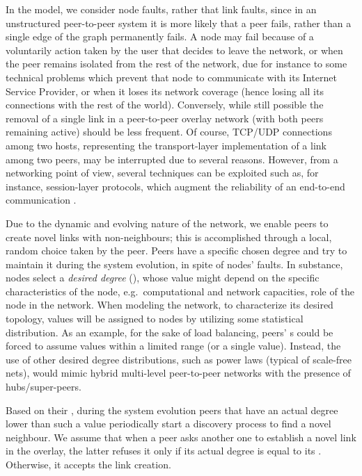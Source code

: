 \documentclass[a4paper,twosided]{article}
\begin{document}
In the model, we consider node faults, rather that link faults,
since in an unstructured peer-to-peer system it is more likely that a peer fails, rather than a single edge of the graph permanently fails. A node may fail because of a voluntarily action taken by the user that decides to leave the network, or when the peer remains isolated from the rest of the network, due for instance to some technical problems which prevent that node to communicate with its Internet Service Provider, or when it loses its network coverage (hence losing all its connections with the rest of the world). 
Conversely, while still possible the removal of a single link in a peer-to-peer overlay network (with both peers remaining active) should be less frequent. Of course, TCP/UDP connections among two hosts, representing the transport-layer implementation of a link among two peers, may be interrupted due to several reasons. However, from a networking point of view, several techniques can be exploited such as, for instance,
session-layer protocols, which augment the reliability of an end-to-end communication 
\cite{aict,disio_ghini}.

Due to the dynamic and evolving nature of the network, we enable peers to create novel links with non-neighbours; this is accomplished through a local, random choice taken by the peer. 
Peers have a specific chosen degree and try to maintain it during the system evolution, in spite of nodes' faults. In substance, nodes select a \emph{desired degree} (), whose value
might depend on the specific characteristics of the node, e.g.~computational and network capacities, role of the node in the network. 
When modeling the network, to characterize its desired topology,  values will be assigned to nodes by utilizing some statistical distribution. As an example, for the sake of load balancing, 
peers' s could be forced to assume values within a limited range (or a single value). Instead, the use of other desired degree distributions, such as power laws (typical of scale-free nets), would mimic hybrid multi-level peer-to-peer networks with the presence of hubs/super-peers.

Based on their , during the system evolution peers that have an actual degree lower than such a value periodically start a discovery process to find a novel neighbour. We assume that when a peer asks another one to establish a novel link in the overlay, the latter refuses it only if its actual degree is equal to its . Otherwise, it accepts the link creation.
\end{document}
